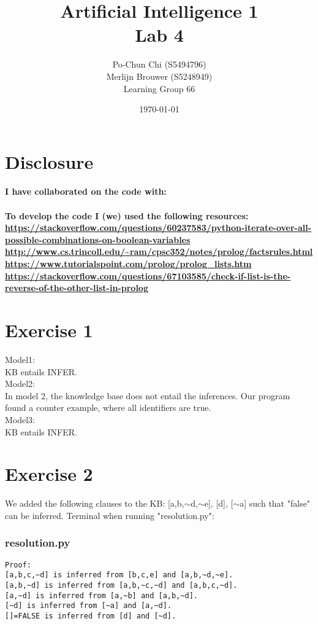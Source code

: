 \documentclass{article}
\title{{\bf Artificial Intelligence 1} \\ Lab 4}%
\author{
Po-Chun Chi (S5494796)
\\
Merlijn Brouwer (S5248949)
\\
Learning Group 66
} %
\date{\today}
\begin{document}
\maketitle

\section*{Disclosure}

\paragraph{I have collaborated on the code with:} 
\paragraph{To develop the code I (we) used the following resources:\\
\url{https://stackoverflow.com/questions/60237583/python-iterate-over-all-possible-combinations-on-boolean-variables}\\
\url{http://www.cs.trincoll.edu/~ram/cpsc352/notes/prolog/factsrules.html}\\
\url{https://www.tutorialspoint.com/prolog/prolog_lists.htm}\\
\url{https://stackoverflow.com/questions/67103585/check-if-list-is-the-reverse-of-the-other-list-in-prolog}}


\section*{Exercise 1}
Model1:
\\
KB entails INFER.
\\
Model2:
\\
In model 2, the knowledge base does not entail the inferences. Our program found a counter example, where all identifiers are true. 
\\
Model3:
\\
KB entails INFER.
\\
\section*{Exercise 2}
We added the following clauses to the KB: [a,b,$\sim$d,$\sim$e], [d], [$\sim$a] such that "false" can be inferred. Terminal when running "resolution.py":
\subsubsection*{resolution.py}
\begin{lstlisting}
Proof:
[a,b,c,~d] is inferred from [b,c,e] and [a,b,~d,~e].
[a,b,~d] is inferred from [a,b,~c,~d] and [a,b,c,~d].
[a,~d] is inferred from [a,~b] and [a,b,~d].
[~d] is inferred from [~a] and [a,~d].
[]=FALSE is inferred from [d] and [~d].
\end{lstlisting}
\end{document}
